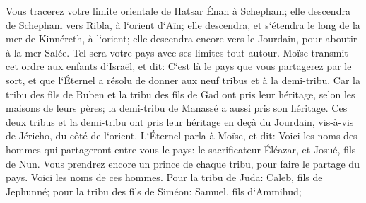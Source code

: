\verse Vous tracerez votre limite orientale de Hatsar Énan à Schepham; 
\verse elle descendra de Schepham vers Ribla, à l`orient d`Aïn; elle descendra, et s`étendra le long de la mer de Kinnéreth, à l`orient; 
\verse elle descendra encore vers le Jourdain, pour aboutir à la mer Salée. Tel sera votre pays avec ses limites tout autour. 
\verse Moïse transmit cet ordre aux enfants d`Israël, et dit: C`est là le pays que vous partagerez par le sort, et que l`Éternel a résolu de donner aux neuf tribus et à la demi-tribu. 
\verse Car la tribu des fils de Ruben et la tribu des fils de Gad ont pris leur héritage, selon les maisons de leurs pères; la demi-tribu de Manassé a aussi pris son héritage. 
\verse Ces deux tribus et la demi-tribu ont pris leur héritage en deçà du Jourdain, vis-à-vis de Jéricho, du côté de l`orient. 
\verse L`Éternel parla à Moïse, et dit: 
\verse Voici les noms des hommes qui partageront entre vous le pays: le sacrificateur Éléazar, et Josué, fils de Nun. 
\verse Vous prendrez encore un prince de chaque tribu, pour faire le partage du pays. 
\verse Voici les noms de ces hommes. Pour la tribu de Juda: Caleb, fils de Jephunné; 
\verse pour la tribu des fils de Siméon: Samuel, fils d`Ammihud; 
